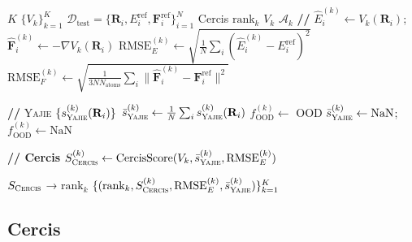 \documentclass[12pt,a4paper]{article}
\theoremstyle{remark}
\newcommand{\D}{\mathcal{D}}
\newcommand{\Yajie}{\textsc{Yajie}}
\newcommand{\Cercis}{\textsc{Cercis}}
\begin{document}
\subsection{}

\begin{algorithm}[H]
\caption{Cercis}
\label{alg:compare}
\begin{algorithmic}[1]
\Require $K$ $\{V_k\}_{k=1}^{K}$ $\D_{\text{test}} = \{\mathbf{R}_i, E_i^{\text{ref}}, \mathbf{F}_i^{\text{ref}}\}_{i=1}^{N}$
\Ensure Cercis $\text{rank}_k$ 
    \State $V_k$ $\mathcal{A}_k$
    \State \textbf{// }
        \State $\hat{E}_i^{(k)} \gets V_k(\mathbf{R}_i)$; $\hat{\mathbf{F}}_i^{(k)} \gets -\nabla V_k(\mathbf{R}_i)$
    \EndFor
    \State $\text{RMSE}_E^{(k)} \gets \sqrt{\frac{1}{N}\sum_i (\hat{E}_i^{(k)} - E_i^{\text{ref}})^2}$
    \State $\text{RMSE}_F^{(k)} \gets \sqrt{\frac{1}{3N N_{\text{atoms}}}\sum_i \|\hat{\mathbf{F}}_i^{(k)} - \mathbf{F}_i^{\text{ref}}\|^2}$

    \State \textbf{// }
        \State \Yajie{} $\{s_{\Yajie}^{(k)}(\mathbf{R}_i)\}$
        \State $\bar{s}_{\Yajie}^{(k)} \gets \frac{1}{N}\sum_i s_{\Yajie}^{(k)}(\mathbf{R}_i)$
        \State $f_{\text{OOD}}^{(k)} \gets$ OOD
    \Else
        \State $\bar{s}_{\Yajie}^{(k)} \gets \text{NaN}$; $f_{\text{OOD}}^{(k)} \gets \text{NaN}$
    \EndIf

    \State \textbf{// Cercis}
    \State $S_{\Cercis}^{(k)} \gets \text{CercisScore}(V_k, \bar{s}_{\Yajie}^{(k)}, \text{RMSE}_E^{(k)})$
\EndFor

\State $S_{\Cercis}$ → $\text{rank}_k$
\State \Return $\{(\text{rank}_k, S_{\Cercis}^{(k)}, \text{RMSE}_E^{(k)}, \bar{s}_{\Yajie}^{(k)})\}_{k=1}^{K}$
\end{algorithmic}
\end{algorithm}

\subsection{Cercis}
\end{document}
